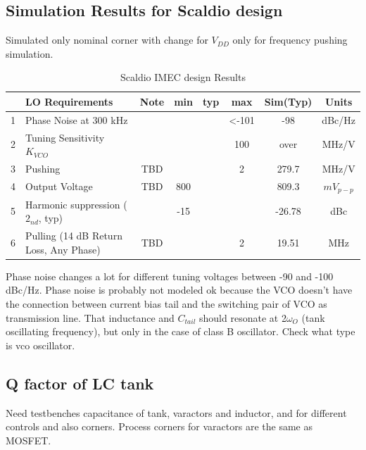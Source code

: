 \subsection{Simulation Results for Scaldio design}

Simulated only nominal corner with change for $V_{DD}$ only for frequency pushing simulation. 

\begin{table}[ht]
	\centering
	\begin{tabular}{|c|l|c|c|c|c|c|c|}
		\hline
		& LO Requirements & Note & min & typ & max & Sim(Typ) & Units \\
		\hline
		1 & Phase Noise at 300 kHz &  &  &  & <-101 & -98 & dBc/Hz  \\ 
		\hline
		2 & Tuning Sensitivity $K_{VCO}$ &  &  &  & 100 & over & MHz/V  \\ 
		\hline
		3 & Pushing & TBD &  &  & 2  & 279.7 & MHz/V  \\ 
		\hline
		4 & Output Voltage & TBD & 800 &  & & 809.3 & $mV_{p-p}$  \\ 
		\hline
		5 & Harmonic suppression ($2_{nd}$, typ) &  & -15 &  & & -26.78 & dBc  \\ 
		\hline
		6 & Pulling (14 dB Return Loss, Any Phase) & TBD &  &  & 2  & 19.51 & MHz  \\ 
		\hline
	\end{tabular}
	\label{table-ScaldioResults}
	\caption{Scaldio IMEC design Results}
\end{table}

Phase noise changes a lot for different tuning voltages between -90 and -100 dBc/Hz. Phase noise is probably not modeled ok because the VCO doesn't have the connection between current bias tail and the switching pair of VCO as transmission line. That inductance and $C_{tail}$ should resonate at 2$\omega_O$ (tank oscillating frequency), but only in the case of class B oscillator. Check what type is vco oscillator. %

\newpage

\subsection{Q factor of LC tank}

Need testbenches capacitance of tank, varactors and inductor, and for different controls and also corners. Process corners for varactors are the same as MOSFET.

